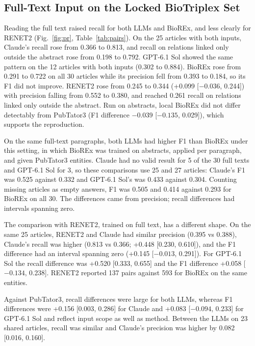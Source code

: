 \documentclass[preprint,10pt,letterpaper]{elsarticle}
\begin{document}
\subsection{Full-Text Input on the Locked BioTriplex Set}
Reading the full text raised recall for both LLMs and BioREx, and less clearly for RENET2 (Fig.~\ref{fig:pr}, Table~\ref{tab:pairs}). On the 25 articles with both inputs, Claude's recall rose from 0.366 to 0.813, and recall on relations linked only outside the abstract rose from 0.198 to 0.792. GPT-6.1 Sol showed the same pattern on the 12 articles with both inputs (0.302 to 0.884). BioREx rose from 0.291 to 0.722 on all 30 articles while its precision fell from 0.393 to 0.184, so its F1 did not improve. RENET2 rose from 0.245 to 0.344 (+0.099 [$-0.036$, 0.244]) with precision falling from 0.552 to 0.380, and reached 0.261 recall on relations linked only outside the abstract. Run on abstracts, local BioREx did not differ detectably from PubTator3 (F1 difference $-0.039$ [$-0.135$, 0.029]), which supports the reproduction.

On the same full-text paragraphs, both LLMs had higher F1 than BioREx under this setting, in which BioREx was trained on abstracts, applied per paragraph, and given PubTator3 entities. Claude had no valid result for 5 of the 30 full texts and GPT-6.1 Sol for 3, so these comparisons use 25 and 27 articles: Claude's F1 was 0.525 against 0.332 and GPT-6.1 Sol's was 0.433 against 0.304. Counting missing articles as empty answers, F1 was 0.505 and 0.414 against 0.293 for BioREx on all 30. The differences came from precision; recall differences had intervals spanning zero.

The comparison with RENET2, trained on full text, has a different shape. On the same 25 articles, RENET2 and Claude had similar precision (0.395 vs 0.388), Claude's recall was higher (0.813 vs 0.366; +0.448 [0.230, 0.610]), and the F1 difference had an interval spanning zero (+0.145 [$-0.013$, 0.291]). For GPT-6.1 Sol the recall difference was +0.520 [0.333, 0.655] and the F1 difference +0.058 [$-0.134$, 0.238]. RENET2 reported 137 pairs against 593 for BioREx on the same entities.

Against PubTator3, recall differences were large for both LLMs, whereas F1 differences were +0.156 [0.003, 0.286] for Claude and +0.083 [$-0.094$, 0.233] for GPT-6.1 Sol and reflect input scope as well as method. Between the LLMs on 23 shared articles, recall was similar and Claude's precision was higher by 0.082 [0.016, 0.160].
\end{document}
